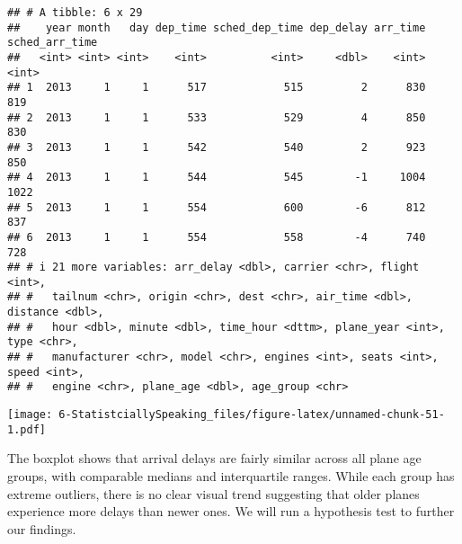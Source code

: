 \documentclass[
]{article}
\newenvironment{Shaded}{\begin{snugshade}}{\end{snugshade}}
\newcommand{\AttributeTok}[1]{\textcolor[rgb]{0.13,0.29,0.53}{#1}}
\newcommand{\ConstantTok}[1]{\textcolor[rgb]{0.56,0.35,0.01}{#1}}
\newcommand{\FunctionTok}[1]{\textcolor[rgb]{0.13,0.29,0.53}{\textbf{#1}}}
\newcommand{\NormalTok}[1]{#1}
\newcommand{\OtherTok}[1]{\textcolor[rgb]{0.56,0.35,0.01}{#1}}
\newcommand{\SpecialCharTok}[1]{\textcolor[rgb]{0.81,0.36,0.00}{\textbf{#1}}}
\begin{document}
\begin{verbatim}
## # A tibble: 6 x 29
##    year month   day dep_time sched_dep_time dep_delay arr_time sched_arr_time
##   <int> <int> <int>    <int>          <int>     <dbl>    <int>          <int>
## 1  2013     1     1      517            515         2      830            819
## 2  2013     1     1      533            529         4      850            830
## 3  2013     1     1      542            540         2      923            850
## 4  2013     1     1      544            545        -1     1004           1022
## 5  2013     1     1      554            600        -6      812            837
## 6  2013     1     1      554            558        -4      740            728
## # i 21 more variables: arr_delay <dbl>, carrier <chr>, flight <int>,
## #   tailnum <chr>, origin <chr>, dest <chr>, air_time <dbl>, distance <dbl>,
## #   hour <dbl>, minute <dbl>, time_hour <dttm>, plane_year <int>, type <chr>,
## #   manufacturer <chr>, model <chr>, engines <int>, seats <int>, speed <int>,
## #   engine <chr>, plane_age <dbl>, age_group <chr>
\end{verbatim}

\texttt{[image: 6-StatistciallySpeaking\_files/figure-latex/unnamed-chunk-51-1.pdf]}

The boxplot shows that arrival delays are fairly similar across all
plane age groups, with comparable medians and interquartile ranges.
While each group has extreme outliers, there is no clear visual trend
suggesting that older planes experience more delays than newer ones. We
will run a hypothesis test to further our findings.

\begin{Shaded}
\end{Shaded}
\end{document}
